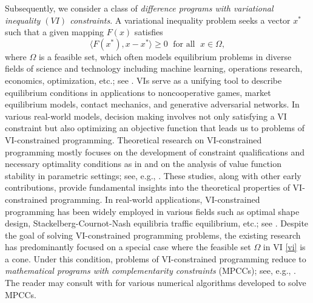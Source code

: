 \documentclass[11pt,a4paper]{article}
\theoremstyle{plain}
\begin{document}
Subsequently, we consider a class of {\em difference programs with variational inequality $(VI)$ constraints}.
A variational inequality problem seeks a vector $x^*$ such that a given mapping $F(x)$ satisfies
\begin{equation}\label{vi}
\langle F(x^*),x-x^* \rangle \geq 0\;\mbox{ for all }\;x\in \Omega,
\end{equation}
where $\Omega$ is a feasible set, which often models equilibrium problems in diverse fields of science and technology including machine learning, operations research, economics, optimization, etc.; see \cite{FacchineiPang2003,gidel2019,kinderlehrer2000variational,nagurney1993network}. VIs serve as a unifying tool to describe equilibrium conditions in applications to noncooperative games, market equilibrium models, contact mechanics, and generative adversarial networks. In various real-world models, decision making involves not only satisfying a VI constraint but also optimizing an objective function that leads us to problems of VI-constrained programming. Theoretical research on VI-constrained programming mostly focuses on the development of constraint qualifications and necessary optimality conditions as in \cite{ye2000constraint} and on the analysis of value function stability in parametric settings; see, e.g., \cite{DuttaLafhimZemkohoZhou2025,lucet2001sensitivity}. 
These studies, along with other early contributions, provide fundamental insights into the theoretical properties of VI-constrained programming.  In real-world applications, VI-constrained programming has been widely employed in various fields such as optimal shape design, Stackelberg-Cournot-Nash equilibria traffic equilibrium, etc.; see \cite{kocvara1992nondifferentiable,samadi2025improved}. Despite the goal of solving VI-constrained programming problems, the existing research has predominantly focused on a special case where the feasible set $\Omega$ in VI \eqref{vi} is a cone. Under this condition, problems of VI-constrained programming reduce to {\em mathematical programs with complementarity constraints} (MPCCs); see, e.g., \cite[Proposition~1.1.3]{FacchineiPang2003}. The reader may consult with \cite{guo2015solving,outrata,scholtes2001convergence,steffensen2010new} for various numerical algorithms developed to solve MPCCs.
\end{document}

